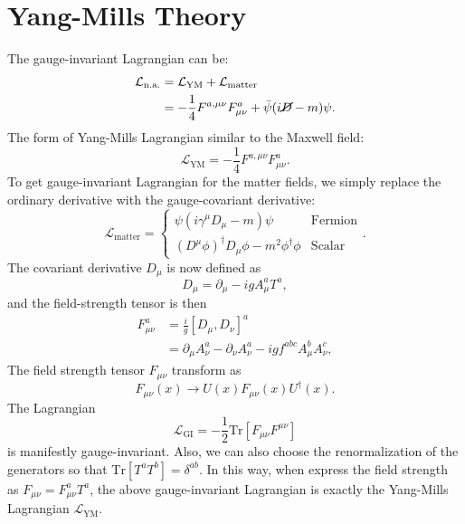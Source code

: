 \documentclass[aps,prb,superscriptaddress,nofootinbib]{revtex4}
\begin{document}
\section{Yang-Mills Theory}
The gauge-invariant Lagrangian can be:
\begin{equation}
\begin{aligned}
	\mathcal L_{\mathrm{n.a.}} &= \mathcal L_{\mathrm{YM}} + \mathcal L_{\mathrm{matter}} \\
	&= -\frac{1}{4} F^{a,\mu\nu} F^a_{\mu\nu} + \bar\psi(i\cancel D-m)\psi.
\end{aligned}
\end{equation}
The form of Yang-Mills Lagrangian similar to the Maxwell field:
\begin{equation}
	\mathcal L_{\mathrm{YM}} = -\frac{1}{4} F^{a,\mu\nu} F^a_{\mu\nu}.
\end{equation}
To get gauge-invariant Lagrangian for the matter fields, we simply replace the ordinary derivative with the gauge-covariant derivative:
\begin{equation}
	\mathcal L_{\mathrm{matter}} = \begin{cases}
		\psi(i\gamma^\mu D_\mu - m)\psi & \text{Fermion} \\
		(D^\mu \phi)^\dagger D_\mu \phi - m^2 \phi^\dagger \phi & \text{Scalar}
	\end{cases}.
\end{equation}
The covariant derivative $D_\mu$ is now defined as
\begin{equation}
	D_\mu = \partial_\mu - i g A_\mu^a T^a,
\end{equation}
and the field-strength tensor is then
\begin{equation}
\begin{aligned}
	F^a_{\mu\nu} &= \frac{i}{g}[D_\mu, D_\nu]^a \\
	&= \partial_\mu A_\nu^a - \partial_\nu A_\nu^a -ig f^{abc} A^b_\mu A^c_\nu,
\end{aligned}
\end{equation}
The field strength tensor $F_{\mu\nu}$ transform as
\begin{equation}
	F_{\mu\nu}(x) \rightarrow U(x) F_{\mu\nu}(x) U^\dagger(x).
\end{equation}
The Lagrangian 
\begin{equation*}
	\mathcal L_{\mathrm{GI}} = -\frac{1}{2} \mathrm{Tr}\left[F_{\mu\nu} F^{\mu\nu}\right]
\end{equation*}
is manifestly gauge-invariant.
Also, we can also choose the renormalization of the generators so that $\mathrm{Tr}[T^aT^b] = \delta^{ab}$.
In this way, when express the field strength as $F_{\mu\nu} = F_{\mu\nu}^a T^a$, the above gauge-invariant Lagrangian is exactly the Yang-Mills Lagrangian $\mathcal L_{\mathrm{YM}}$.
\end{document}
